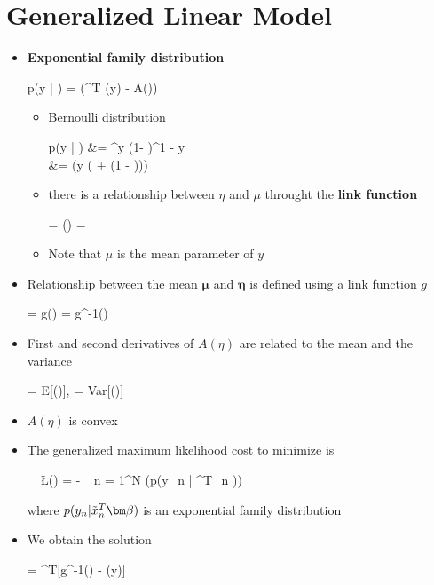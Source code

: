 \section{Generalized Linear Model}
\begin{itemize}
	\item \textbf{Exponential family distribution}
	\begin{myalign*}
	    p(\*y | \bm \eta) =  \exp(\bm \eta^T \bm \phi(\*y) - A(\bm \eta))
	\end{myalign*}
	\begin{itemize}
		\item Bernoulli distribution
		\begin{myalign*}
		    p(y | \mu) &= \mu^y (1- \mu)^{1 - y}\\
		    &= \exp(y \log( + \log(1 - \mu)))
		\end{myalign*}
		\item there is a relationship between $\eta$ and $\mu$ throught the \textbf{link function}
		\begin{myalign*}
		    \eta = \log() \leftrightarrow \mu = \frac{e^{\eta}}{1 + e^{\eta}}
		\end{myalign*}
		\item Note that $\mu$ is the mean parameter of $y$
	\end{itemize}
	\item Relationship between the mean $\bm \mu$ and $\bm \eta$ is defined using a link function $g$
	\begin{myalign*}
	    \bm \eta = \*g(\bm \mu) \Leftrightarrow \bm \mu = \*g^{-1}(\bm \eta)
	\end{myalign*}
	\item First and second derivatives of $A(\eta)$ are related to the mean and the variance
	\begin{myalign*}
	     = E[\bm \phi(\eta)], \hspace{4pt}  = Var[\bm \phi(\eta)]
	\end{myalign*}
	\item $A(\eta)$ is convex
	\item The generalized maximum likelihood cost to minimize is
	\begin{myalign*}
	    \min_{\bm \beta} \L(\bm \beta) = - \sum_{n = 1}^N \log(p(y_n | ^T_n \bm \beta))
	\end{myalign*}
	where $p(y_n | \tilde{\*x}^T_n \bm \beta)$ is an exponential family distribution
	\item We obtain the solution
	\begin{myalign*}
	     = ^T[\*g^{-1}(\bm \eta) - \bm \phi(\*y)]
	\end{myalign*}
\end{itemize}

